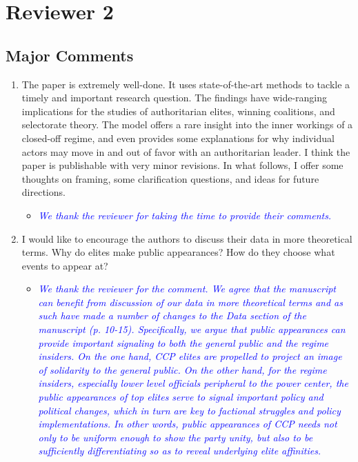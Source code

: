 \section*{Reviewer 2}

\subsection*{Major Comments}

\begin{enumerate}
	\item The paper is extremely well-done.  It uses state-of-the-art methods to tackle a timely and important research question. The findings have wide-ranging implications for the studies of authoritarian elites, winning coalitions, and selectorate theory.  The model offers a rare insight into the inner workings of a closed-off regime, and even provides some explanations for why individual actors may move in and out of favor with an authoritarian leader.  I think the paper is publishable with very minor revisions. In what follows, I offer some thoughts on framing, some clarification questions, and ideas for future directions.
	\begin{itemize}
		\item \textcolor{blue}{ \emph{
		We thank the reviewer for taking the time to provide their comments.
		}}
	\end{itemize}
	\item I would like to encourage the authors to discuss their data in more theoretical terms.  Why do elites make public appearances? How do they choose what events to appear at?
		\begin{itemize}
		\item \textcolor{blue}{ \emph{
			We thank the reviewer for the comment.  We agree that the manuscript can benefit from discussion of our data in more theoretical terms and as such have made a number of changes to the Data section of the manuscript (p. 10-15).  Specifically, we argue that public appearances can provide important signaling to both the general public and the regime insiders.  On the one hand, CCP elites are propelled to project an image of solidarity to the general public.  On the other hand, for the regime insiders, especially lower level officials peripheral to the power center, the public appearances of top elites serve to signal important policy and political changes, which in turn are key to factional struggles and policy implementations.   In other words, public appearances of CCP needs not only to be uniform enough to show the party unity, but also to be sufficiently differentiating so as to reveal underlying elite affinities.   
			}}
	\end{itemize}


\end{enumerate}
